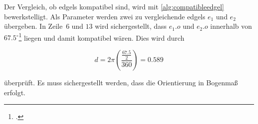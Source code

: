 

Der Vergleich, ob \gls{edgels} kompatibel sind, wird mit \autoref{alg:compatibleedgel} bewerkstelligt. Als Parameter
 werden zwei zu vergleichende \gls{edgels} $e_1$ und $e_2$ übergeben. In Zeile~$6$ und $13$ wird sichergestellt, dass
 $e_1.o$ und $e_2.o$ innerhalb von $67.5^\circ$\footcite[Vgl.][S.~417]{clarke96} liegen und damit kompatibel wären.
 Dies wird durch

\begin{equation}
	d = 2 \pi \left( \frac{ \frac{67.5}{2} }{360} \right) = 0.589
\end{equation}

überprüft. Es muss sichergestellt werden, dass die Orientierung in Bogenmaß erfolgt.




